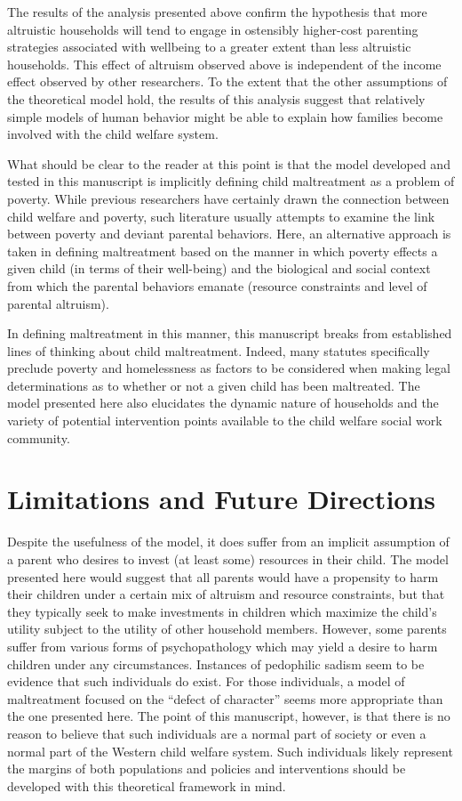 The results of the analysis presented above confirm the hypothesis that
more altruistic households will tend to engage in ostensibly higher-cost parenting strategies
associated with wellbeing to a greater extent than less altruistic
households. This effect of altruism observed above is independent of the
income effect observed by other researchers. To the extent that the
other assumptions of the theoretical model hold, the results of this
analysis suggest that relatively simple models of human behavior might
be able to explain how families become involved with the child welfare
system.

What should be clear to the reader at this point is that the model
developed and tested in this manuscript is implicitly defining child
maltreatment as a problem of poverty. While previous researchers have
certainly drawn the connection between child welfare and poverty, such
literature usually attempts to examine the link between poverty and
deviant parental behaviors. Here, an alternative approach is taken in
defining maltreatment based on the manner in which poverty effects a
given child (in terms of their well-being) and the biological and social
context from which the parental behaviors emanate (resource constraints
and level of parental altruism).

In defining maltreatment in this manner, this manuscript breaks from
established lines of thinking about child maltreatment. Indeed, many
statutes specifically preclude poverty and homelessness as factors to be
considered when making legal determinations as to whether or not a given
child has been maltreated. The model presented here also elucidates the dynamic nature
of households and the variety of potential intervention points available
to the child welfare social work community.

\section{Limitations and Future
Directions}\label{limitations-and-future-directions}

Despite the usefulness of the model, it does suffer from an implicit
assumption of a parent who desires to invest (at least some) resources
in their child. The model presented here would suggest that all parents
would have a propensity to harm their children under a certain mix of
altruism and resource constraints, but that they typically seek to make
investments in children which maximize the child's utility subject to the utility of other household members. However,
some parents suffer from various forms of psychopathology which may
yield a desire to harm children under any circumstances. Instances of
pedophilic sadism seem to be evidence that such individuals do exist.
For those individuals, a model of maltreatment focused on the \citet{Kempe1962} ``defect of character'' seems
more appropriate than the one presented here. The point of this
manuscript, however, is that there is no reason to believe that such
individuals are a normal part of society or even a normal part of the
Western child welfare system. Such individuals likely represent the
margins of both populations and policies and interventions should be
developed with this theoretical framework in mind.

